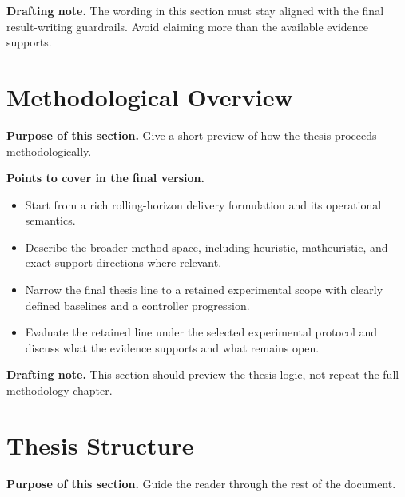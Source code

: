 \textbf{Drafting note.}
The wording in this section must stay aligned with the final result-writing guardrails.
Avoid claiming more than the available evidence supports.

\section{Methodological Overview}
\label{sec:intro:method-overview}

\textbf{Purpose of this section.}
Give a short preview of how the thesis proceeds methodologically.

\textbf{Points to cover in the final version.}
\begin{itemize}
    \item Start from a rich rolling-horizon delivery formulation and its operational semantics.
    \item Describe the broader method space, including heuristic, matheuristic, and exact-support directions where relevant.
    \item Narrow the final thesis line to a retained experimental scope with clearly defined baselines and a controller progression.
    \item Evaluate the retained line under the selected experimental protocol and discuss what the evidence supports and what remains open.
\end{itemize}

\textbf{Drafting note.}
This section should preview the thesis logic, not repeat the full methodology chapter.

\section{Thesis Structure}
\label{sec:intro:structure}

\textbf{Purpose of this section.}
Guide the reader through the rest of the document.

